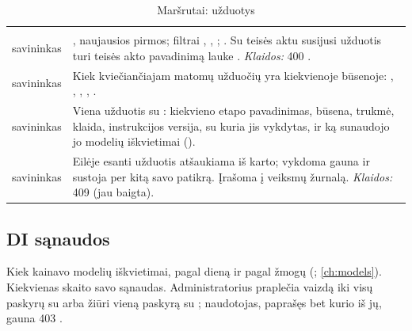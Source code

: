 \begin{xltabular}{\textwidth}{@{}L{19mm}Y@{}}
\caption{Maršrutai: užduotys}\label{tab:api:jobs}\\
\toprule {} &  \\ \midrule \endfirsthead
\toprule {} &  \\ \midrule \endhead
\bottomrule \endlastfoot
{}
savininkas & , naujausios pirmos; filtrai , , ;
  . Su teisės aktu susijusi užduotis turi teisės akto pavadinimą lauke .
  \emph{Klaidos:} 400 . \\
\addlinespace
{}
savininkas & Kiek kviečiančiajam matomų užduočių yra kiekvienoje būsenoje: ,
  , , , . \\
\addlinespace
{}
savininkas & Viena užduotis su : kiekvieno etapo pavadinimas, būsena, trukmė, klaida,
  instrukcijos versija, su kuria jis vykdytas, ir ką sunaudojo jo modelių iškvietimai
  (). \\
\addlinespace
{}
savininkas & Eilėje esanti užduotis atšaukiama iš karto; vykdoma gauna  ir
  sustoja per kitą savo patikrą. Įrašoma į veiksmų žurnalą. \emph{Klaidos:} 409
   (jau baigta). \\
\end{xltabular}

\subsection{DI sąnaudos}\label{sec:api:usage}

Kiek kainavo modelių iškvietimai, pagal dieną ir pagal žmogų (;
\cref{ch:models}). Kiekvienas skaito savo sąnaudas. Administratorius praplečia vaizdą iki visų
paskyrų su  arba žiūri vieną paskyrą su ; naudotojas, paprašęs bet
kurio iš jų, gauna 403 .

